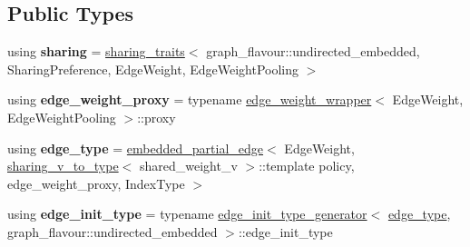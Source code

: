 \subsection*{Public Types}
\begin{DoxyCompactItemize}
\item 
\mbox{\label{structsequoia_1_1maths_1_1graph__impl_1_1edge__type__generator_3_01graph__flavour_1_1undirected_9e17ae143379e09deb5ba438fa684125_afe88022b4ea66de61b891144a74b8ef1}} 
using {\bfseries sharing} = \mbox{\hyperlink{structsequoia_1_1maths_1_1graph__impl_1_1sharing__traits}{sharing\+\_\+traits}}$<$ graph\+\_\+flavour\+::undirected\+\_\+embedded, Sharing\+Preference, Edge\+Weight, Edge\+Weight\+Pooling $>$
\item 
\mbox{\label{structsequoia_1_1maths_1_1graph__impl_1_1edge__type__generator_3_01graph__flavour_1_1undirected_9e17ae143379e09deb5ba438fa684125_a74cc75d59ef003586befc9dae0e95e8b}} 
using {\bfseries edge\+\_\+weight\+\_\+proxy} = typename \mbox{\hyperlink{structsequoia_1_1maths_1_1graph__impl_1_1edge__weight__wrapper}{edge\+\_\+weight\+\_\+wrapper}}$<$ Edge\+Weight, Edge\+Weight\+Pooling $>$\+::proxy
\item 
\mbox{\label{structsequoia_1_1maths_1_1graph__impl_1_1edge__type__generator_3_01graph__flavour_1_1undirected_9e17ae143379e09deb5ba438fa684125_aebfa521d749b2de2e4afb8c5ebd92079}} 
using {\bfseries edge\+\_\+type} = \mbox{\hyperlink{classsequoia_1_1maths_1_1embedded__partial__edge}{embedded\+\_\+partial\+\_\+edge}}$<$ Edge\+Weight, \mbox{\hyperlink{structsequoia_1_1maths_1_1graph__impl_1_1sharing__v__to__type}{sharing\+\_\+v\+\_\+to\+\_\+type}}$<$ shared\+\_\+weight\+\_\+v $>$\+::template policy, edge\+\_\+weight\+\_\+proxy, Index\+Type $>$
\item 
\mbox{\label{structsequoia_1_1maths_1_1graph__impl_1_1edge__type__generator_3_01graph__flavour_1_1undirected_9e17ae143379e09deb5ba438fa684125_a16e51c1af2b7c26d1f469d19f44c50fd}} 
using {\bfseries edge\+\_\+init\+\_\+type} = typename \mbox{\hyperlink{structsequoia_1_1maths_1_1graph__impl_1_1edge__init__type__generator}{edge\+\_\+init\+\_\+type\+\_\+generator}}$<$ \mbox{\hyperlink{classsequoia_1_1maths_1_1embedded__partial__edge}{edge\+\_\+type}}, graph\+\_\+flavour\+::undirected\+\_\+embedded $>$\+::edge\+\_\+init\+\_\+type
\end{DoxyCompactItemize}
